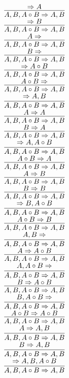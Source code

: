 \documentclass[11pt]{article}
\begin{document}
\begin{center}
\bigskip
\\$\infer{A, B, A\circ B\Rightarrow A, B}{\Rightarrow A}$
\bigskip
\\$\infer{A, B, A\circ B\Rightarrow A, B}{\Rightarrow B}$
\bigskip
\\$\infer{A, B, A\circ B\Rightarrow A, B}{A\Rightarrow }$
\bigskip
\\$\infer{A, B, A\circ B\Rightarrow A, B}{B\Rightarrow }$
\bigskip
\\$\infer{A, B, A\circ B\Rightarrow A, B}{\Rightarrow A\circ B}$
\bigskip
\\$\infer{A, B, A\circ B\Rightarrow A, B}{A\circ B\Rightarrow }$
\bigskip
\\$\infer{A, B, A\circ B\Rightarrow A, B}{\Rightarrow A, B}$
\bigskip
\\$\infer{A, B, A\circ B\Rightarrow A, B}{A\Rightarrow A}$
\bigskip
\\$\infer{A, B, A\circ B\Rightarrow A, B}{B\Rightarrow A}$
\bigskip
\\$\infer{A, B, A\circ B\Rightarrow A, B}{\Rightarrow A, A\circ B}$
\bigskip
\\$\infer{A, B, A\circ B\Rightarrow A, B}{A\circ B\Rightarrow A}$
\bigskip
\\$\infer{A, B, A\circ B\Rightarrow A, B}{A\Rightarrow B}$
\bigskip
\\$\infer{A, B, A\circ B\Rightarrow A, B}{B\Rightarrow B}$
\bigskip
\\$\infer{A, B, A\circ B\Rightarrow A, B}{\Rightarrow B, A\circ B}$
\bigskip
\\$\infer{A, B, A\circ B\Rightarrow A, B}{A\circ B\Rightarrow B}$
\bigskip
\\$\infer{A, B, A\circ B\Rightarrow A, B}{A, B\Rightarrow }$
\bigskip
\\$\infer{A, B, A\circ B\Rightarrow A, B}{A\Rightarrow A\circ B}$
\bigskip
\\$\infer{A, B, A\circ B\Rightarrow A, B}{A, A\circ B\Rightarrow }$
\bigskip
\\$\infer{A, B, A\circ B\Rightarrow A, B}{B\Rightarrow A\circ B}$
\bigskip
\\$\infer{A, B, A\circ B\Rightarrow A, B}{B, A\circ B\Rightarrow }$
\bigskip
\\$\infer{A, B, A\circ B\Rightarrow A, B}{A\circ B\Rightarrow A\circ B}$
\bigskip
\\$\infer{A, B, A\circ B\Rightarrow A, B}{A\Rightarrow A, B}$
\bigskip
\\$\infer{A, B, A\circ B\Rightarrow A, B}{B\Rightarrow A, B}$
\bigskip
\\$\infer{A, B, A\circ B\Rightarrow A, B}{\Rightarrow A, B, A\circ B}$

\end{center}
\end{document}
